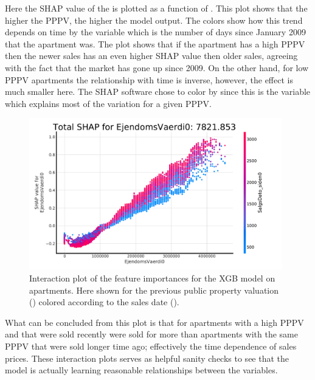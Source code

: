 Here the SHAP value of the  is plotted as a function of . This plot shows that the higher the PPPV, the higher the model output. The colors show how this trend depends on time by the variable  which is the number of days since January  2009 that the apartment was. The plot shows that if the apartment has a high PPPV then the newer sales has an even higher SHAP value then older sales, agreeing with the fact that the market has gone up since 2009. On the other hand, for low PPPV apartments the relationship with time is inverse, however, the effect is much smaller here. The SHAP software chose to color by  since this is the variable which explains most of the variation for a given PPPV. 

\begin{figure}
  \centerfloat
  \includegraphics[draft=false, width=0.98\textwidth, trim=15 15 40 40, clip]{figures/housing/Ejerlejlighed_v19_cut_all_Ncols_all_xgb_tight_SHAP_vals_interaction_Vaerdi0.pdf}
  \caption[Feature Importance Interaction Plot for Apartments for the XGB Model]
          {Interaction plot of the feature importances for the XGB model on apartments. Here shown for the previous public property valuation () colored according to the sales date ().} 
  \label{fig:h:shap_overview_interaction}
\end{figure}

What can be concluded from this plot is that for apartments with a high PPPV and that were sold recently were sold for more than apartments with the same PPPV that were sold longer time ago; effectively the time dependence of sales prices. These interaction plots serves as helpful sanity checks to see that the model is actually learning reasonable relationships between the variables. 

